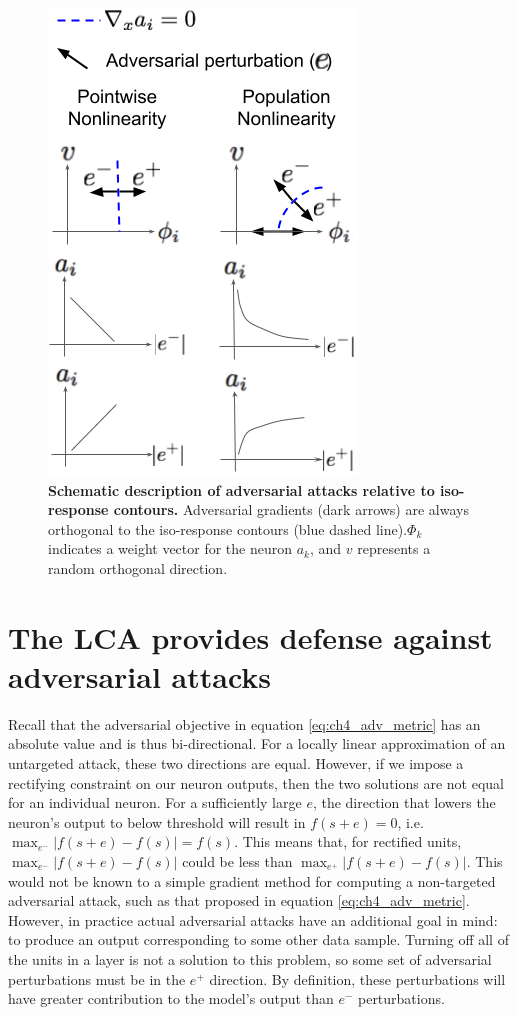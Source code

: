 \begin{figure}
    \centering
    \includegraphics[width=0.3\columnwidth]{figures/adversarial_gradients_iso_contours.png}
    \caption{\textbf{Schematic description of adversarial attacks relative to iso-response contours.} Adversarial gradients (dark arrows) are always orthogonal to the iso-response contours (blue dashed line).$\Phi_{k}$ indicates a weight vector for the neuron $a_{k}$, and $v$ represents a random orthogonal direction.}
    \label{fig:ch4_adv_grads}
\end{figure}

\section{The LCA provides defense against adversarial attacks}
Recall that the adversarial objective in equation \eqref{eq:ch4_adv_metric} has an absolute value and is thus bi-directional.
For a locally linear approximation of an untargeted attack, these two directions are equal.
However, if we impose a rectifying constraint on our neuron outputs, then the two solutions are not equal for an individual neuron.
For a sufficiently large $e$, the direction that lowers the neuron's output to below threshold will result in $f(s+e)=0$, i.e. $\max_{e^{-}}|f(s+e)-f(s)| = f(s)$.
This means that, for rectified units, $\max_{e^{-}}|f(s+e)-f(s)|$ could be less than $\max_{e^{+}}|f(s+e)-f(s)|$.
This would not be known to a simple gradient method for computing a non-targeted adversarial attack, such as that proposed in equation \eqref{eq:ch4_adv_metric}.
However, in practice actual adversarial attacks have an additional goal in mind: to produce an output corresponding to some other data sample.
Turning off all of the units in a layer is not a solution to this problem, so some set of adversarial perturbations must be in the $e^{+}$ direction.
By definition, these perturbations will have greater contribution to the model's output than $e^{-}$ perturbations.

